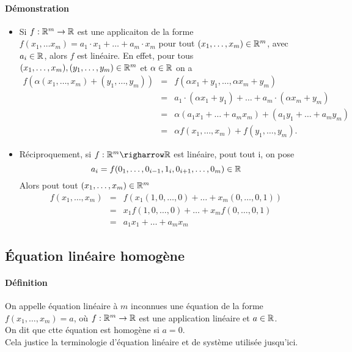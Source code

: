 \paragraph{Démonstration}
\begin{itemize}
  \item Si $f: \mathbb{R}^m \rightarrow \mathbb{R}$ est une applicaiton de la forme $f(x_1, \ldots x_m) = a_1 \cdot x_1 + \ldots + a_m \cdot x_m$ pour tout $(x_1, \ldots, x_m) \in \mathbb{R}^m$, avec $a_i \in \mathbb{R}$, alors $f$ est linéaire. En effet, pour tous $(x_1, \ldots, x_m), (y_1, \ldots, y_m) \in \mathbb{R}^m$ et $\alpha \in \mathbb{R}$ on a
    \begin{eqnarray*}
      f(\alpha(x_1, \ldots, x_m) + (y_1, \ldots, y_m)) &=& f(\alpha x_1 + y_1, \ldots, \alpha x_m + y_m) \\
        &=& a_1 \cdot (\alpha x_1 + y_1) + \ldots + a_m \cdot (\alpha x_m + y_m) \\
        &=& \alpha (a_1 x_1 + \ldots + a_m x_m) + (a_1 y_1 + \ldots + a_m y_m) \\
        &=& \alpha f(x_1, \ldots, x_m) + f(y_1, \ldots, y_m).
    \end{eqnarray*}
  \item Réciproquement, si $f: \R^m \righarrow \R$ est linéaire, pout tout i, on pose 
    $$a_i = f(0_1, \ldots, 0_{i-1}, 1_i, 0_{i+1}, \ldots, 0_m) \in \mathbb{R}$$
    Alors pout tout $(x_1, \ldots, x_m) \in \mathbb{R}^m$
    \begin{eqnarray*}
      f(x_1, \ldots, x_m) &=& f(x_1 (1, 0, \ldots, 0) + \ldots + x_m (0, \ldots, 0, 1)) \\
        &=& x_1 f(1, 0, \ldots, 0) + \ldots + x_m f(0, \ldots, 0, 1) \\
        &=& a_1 x_1 + \ldots + a_m x_m
    \end{eqnarray*}
\end{itemize}

%
\subsection{Équation linéaire homogène}
%
\paragraph{Définition} On appelle équation linéaire à $m$ inconnues une équation de la forme $f(x_1, \ldots, x_m) = a$, où $f: \mathbb{R}^m \rightarrow \mathbb{R}$ est une application linéaire et $a \in \mathbb{R}$. \\
On dit que ctte équation est homogène si $a=0$. \\
Cela justice la terminologie d'équation linéaire et de système utilisée jusqu'ici.

